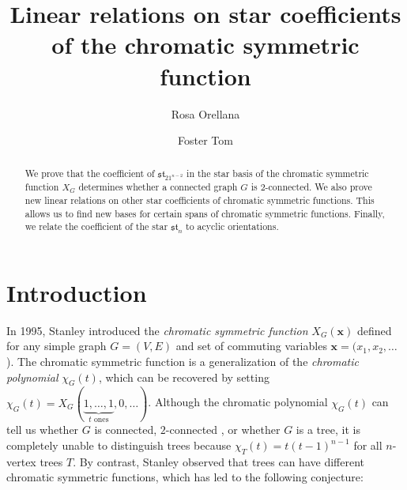 \documentclass[12pt]{amsart}  %
\theoremstyle{definition}
\theoremstyle{remark}
\numberwithin{equation}{section}
\begin{document}
\title{Linear relations on star coefficients of the chromatic symmetric function}

\author[Orellana]{Rosa Orellana}
\address[R. Orellana]{Mathematics Department, Dartmouth College,
Hanover, NH 03755, U.S.A.}
\author[Tom]{Foster Tom}
\address[F. Tom]{Mathematics Department, Dartmouth College,
Hanover, NH 03755, U.S.A.}
\keywords{}


\begin{abstract}
We prove that the coefficient of $\mathfrak{st}_{21^{n-2}}$ in the star basis of the chromatic symmetric function $X_G$ determines whether a connected graph $G$ is $2$-connected. We also prove new linear relations on other star coefficients of chromatic symmetric functions. This allows us to find new bases for certain spans of chromatic symmetric functions. Finally, we relate the coefficient of the star $\mathfrak{st}_n$ to acyclic orientations.
\end{abstract}


\maketitle

\section{Introduction}\label{section:introduction}

In 1995, Stanley \cite{chromsym} introduced the \emph{chromatic symmetric function} $X_G(\bm x)$ defined for any simple graph $G=(V,E)$ and set of commuting variables ${\bm x}=(x_1, x_2, \ldots$). The chromatic symmetric function is a generalization of the \emph{chromatic polynomial} $\chi_G(t)$, which can be recovered by setting $\chi_G(t)=X_G(\underbrace{1,\ldots,1}_{t\text{ ones}},0,\ldots)$. Although the chromatic polynomial $\chi_G(t)$ can tell us whether $G$ is connected, $2$-connected \cite{cutchrom}, or whether $G$ is a tree, it is completely unable to distinguish trees because $\chi_T(t)=t(t-1)^{n-1}$ for all $n$-vertex trees $T$. By contrast, Stanley observed that trees can have different chromatic symmetric functions, which has led to the following conjecture: 
\end{document}

